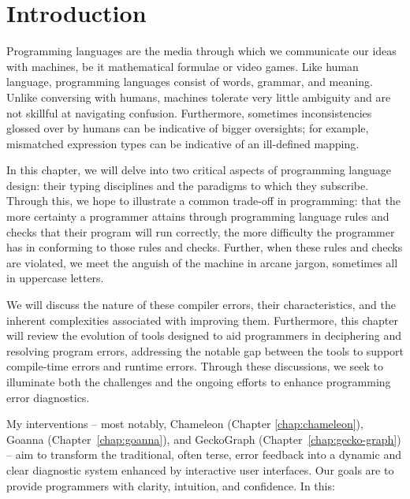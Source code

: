 
\chapter{Introduction}

\label{chap:introduction} 

\graphicspath{{Figures/Introduction}}

Programming languages are the media through which we communicate our ideas with machines, be it mathematical formulae or video games. Like human language, programming languages consist of words, grammar, and meaning. Unlike conversing with humans, machines tolerate very little ambiguity and are not skillful at navigating confusion. Furthermore, sometimes inconsistencies glossed over by humans can be indicative of bigger oversights; for example, mismatched expression types can be indicative of an ill-defined mapping. 

In this chapter, we will delve into two critical aspects of programming language design: their typing disciplines and the paradigms to which they subscribe. Through this, we hope to illustrate a common trade-off in programming: that the more certainty a programmer attains through programming language rules and checks that their program will run correctly, the more difficulty the programmer has in conforming to those rules and checks. Further, when these rules and checks are violated, we meet the anguish of the machine in arcane jargon, sometimes all in uppercase letters.

We will discuss the nature of these compiler errors, their characteristics, and the inherent complexities associated with improving them. Furthermore, this chapter will review the evolution of tools designed to aid programmers in deciphering and resolving program errors, addressing the notable gap between the tools to support compile-time errors and runtime errors. Through these discussions, we seek to illuminate both the challenges and the ongoing efforts to enhance programming error diagnostics.

My interventions -- most notably, Chameleon (Chapter \ref{chap:chameleon}), Goanna (Chapter~\ref{chap:goanna}), and GeckoGraph (Chapter~\ref{chap:gecko-graph}) -- aim to transform the traditional, often terse, error feedback into a dynamic and clear diagnostic system enhanced by interactive user interfaces. Our goals are to provide programmers with clarity, intuition, and confidence. In this:

